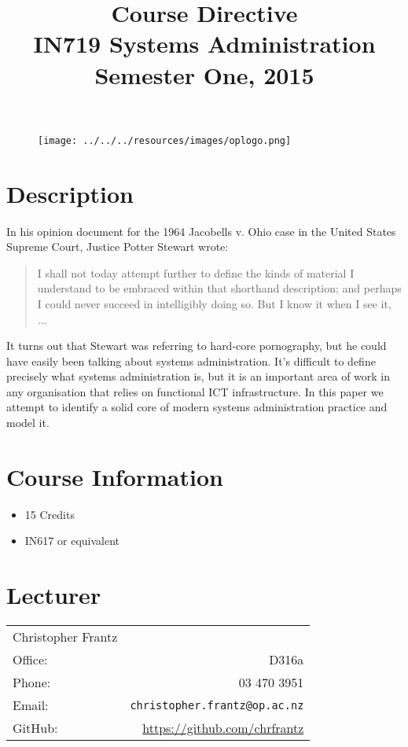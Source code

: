 \documentclass{article}
\begin{document}
\begin{figure}
\texttt{[image: ../../../resources/images/oplogo.png]}
\end{figure}

\title{Course Directive\\IN719 Systems Administration \\Semester One, 2015}
\date{}
\maketitle

\section*{Description}
In his opinion document for the 1964 Jacobells v. Ohio case in the United States Supreme Court, Justice Potter Stewart wrote:
\begin{quote}
I shall not today attempt further to define the kinds of material I understand to be embraced within that shorthand description; and perhaps I could never succeed in intelligibly doing so. But I know it when I see it, ...
\end{quote}
It turns out that Stewart was referring to hard-core pornography, but he could have easily been talking about systems administration. It's difficult to define precisely what systems administration is, but it is an important area of work in any organisation that relies on functional ICT infrastructure. In this paper we attempt to identify a solid core of modern systems administration practice and model it.



\section*{Course Information}
\begin{itemize}
  \item 15 Credits
  \item IN617 or equivalent
\end{itemize}

\section*{Lecturer}
\begin{tabular}{lr}

     Christopher Frantz &    \\
     Office: & D316a \\
     Phone: & 03 470 3951 \\
     Email: & \texttt{christopher.frantz@op.ac.nz} \\
     GitHub: & \url{https://github.com/chrfrantz} 
\end{tabular}
\end{document}
